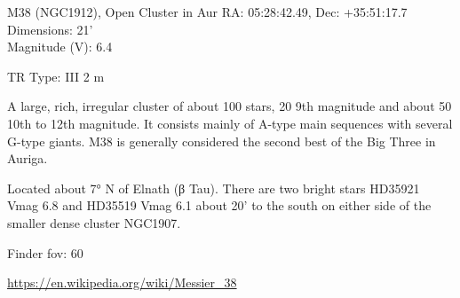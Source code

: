 \begin{block}{M38 (NGC1912), Open Cluster in Aur}
    RA: 05:28:42.49, Dec: +35:51:17.7 \\ 
    Dimensions: 21' \\ 
    Magnitude (V): 6.4

    TR Type: III 2 m

    A large, rich, irregular cluster of about 100 stars, 20 9th magnitude and
    about 50 10th to 12th magnitude. It consists mainly of A-type main
    sequences with several G-type giants. M38 is generally considered the
    second best of the Big Three in Auriga.
    
    Located about 7° N of Elnath (β Tau). There are two bright stars HD35921
    Vmag 6.8 and HD35519 Vmag 6.1 about 20' to the south on either side of the
    smaller dense cluster NGC1907.


    Finder fov: 60 

    \url{https://en.wikipedia.org/wiki/Messier_38} 
\end{block}

